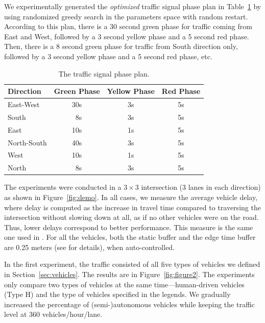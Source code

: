 We experimentally generated the \emph{optimized} traffic signal phase
plan in Table~\ref{table:phase} by using randomized greedy search in
the parameters space with random restart.  According to this plan,
there is a 30 second green phase for traffic coming from East and
West, followed by a 3 second yellow phase and a 5 second red
phase. Then, there is a 8 second green phase for traffic from South
direction only, followed by a 3 second yellow phase and a 5 second red
phase, etc.


\begin{table}
\caption{The traffic signal phase plan.}
\label{table:phase}
\centering
\begin{tabular}{|l|c|c|c|}
\hline
Direction & Green Phase & Yellow Phase & Red Phase \\
\hline
  East-West & 30s & 3s & 5s \\
  South & \ 8s & 3s & 5s \\
  East & 10s & 1s & 5s \\
  North-South & 40s & 3s & 5s \\
  West & 10s & 1s & 5s \\
  North & \ 8s & 3s & 5s \\
\hline
\end{tabular}
\end{table}

The experiments were conducted in a $3 \times 3$ intersection (3 lanes
in each direction) as shown in Figure~\ref{fig:demo}.  In all cases,
we measure the average vehicle delay, where delay is computed as the
increase in travel time compared to traversing the intersection
without slowing down at all, as if no other vehicles were on the
road. Thus, lower delays correspond to better performance.  This
measure is the same one used in \cite{bib:Dresner08Multiagent}. For
all the vehicles, both the static buffer and the edge time buffer are
0.25 meters (see \cite{bib:Dresner08Multiagent} for details), when
auto-controlled.


In the first experiment, the traffic consisted of all five types of
vehicles we defined in Section~\ref{sec:vehicles}. The results are in
Figure~\ref{fig:figure2}. The experiments only compare two types of
vehicles at the same time---human-driven vehicles (Type H) and the
type of vehicles specified in the legends. We gradually increased the
percentage of (semi-)autonomous vehicles while keeping the traffic
level at 360 vehicles/hour/lane.

